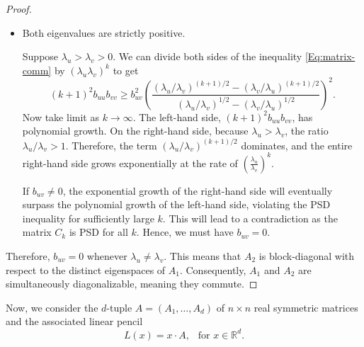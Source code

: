 \documentclass[11pt,reqno]{amsart}
\theoremstyle{plain}
\theoremstyle{definition}
\numberwithin{equation}{section}
\begin{document}
\begin{proof}
\begin{itemize}
\item [\text{Case 2.}] Both eigenvalues are strictly positive.

Suppose $\lambda_u > \lambda_v > 0$. We can divide both sides of the inequality \eqref{Eq:matrix-comm} by $(\lambda_u \lambda_v)^k$ to get
$$
(k+1)^2 b_{uu} b_{vv} \ge b_{uv}^2 \left( \frac{(\lambda_u/\lambda_v)^{(k+1)/2} - (\lambda_v/\lambda_u)^{(k+1)/2}}{(\lambda_u/\lambda_v)^{1/2} - (\lambda_v/\lambda_u)^{1/2}} \right)^2.
$$
Now take limit as $k \to \infty$.
The left-hand side, $(k+1)^2 b_{uu} b_{vv}$, has polynomial growth.
On the right-hand side, because $\lambda_u > \lambda_v$, the ratio $\lambda_u/\lambda_v > 1$. Therefore, the term $(\lambda_u/\lambda_v)^{(k+1)/2}$ dominates, and the entire right-hand side grows exponentially at the rate of $(\frac{\lambda_u}{\lambda_v})^k$.

If $b_{uv} \neq 0$, the exponential growth of the right-hand side will eventually surpass the polynomial growth of the left-hand side, violating the PSD inequality for sufficiently large $k$. This will lead to a contradiction as the matrix $C_k$ is PSD for all $k$. Hence, we must have $b_{uv} = 0$.
\end{itemize}
Therefore, $b_{uv} = 0$ whenever $\lambda_u \neq \lambda_v$. This means that $A_2$ is block-diagonal with respect to the distinct eigenspaces of $A_1$. Consequently, $A_1$ and $A_2$ are simultaneously diagonalizable, meaning they commute.
\end{proof}

 
  Now, we consider the $d$-tuple $A=(A_1, \dots, A_d)$ of $n \times n$ real symmetric matrices and the associated linear pencil
$$L(x) = x\cdot A, \ \ \text{ for } x\in \mathbb{R}^d.$$
\end{document}
